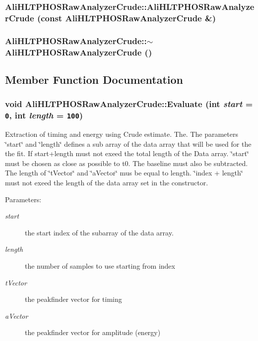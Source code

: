 \subsubsection{\setlength{\rightskip}{0pt plus 5cm}Ali\-HLTPHOSRaw\-Analyzer\-Crude::Ali\-HLTPHOSRaw\-Analyzer\-Crude (const {\bf Ali\-HLTPHOSRaw\-Analyzer\-Crude} \&)}\label{classAliHLTPHOSRawAnalyzerCrude_a1}


\subsubsection{\setlength{\rightskip}{0pt plus 5cm}Ali\-HLTPHOSRaw\-Analyzer\-Crude::$\sim${\bf Ali\-HLTPHOSRaw\-Analyzer\-Crude} ()\hspace{0.3cm}{\tt  [virtual]}}\label{classAliHLTPHOSRawAnalyzerCrude_a3}




\subsection{Member Function Documentation}
\subsubsection{\setlength{\rightskip}{0pt plus 5cm}void Ali\-HLTPHOSRaw\-Analyzer\-Crude::Evaluate (int {\em start} = {\tt 0}, int {\em length} = {\tt 100})\hspace{0.3cm}{\tt  [virtual]}}\label{classAliHLTPHOSRawAnalyzerCrude_a4}


Extraction of timing and energy using Crude estimate. The. The parameters \char`\"{}start\char`\"{} and \char`\"{}length\char`\"{} defines a sub array of the data array that will be used for the the fit. If start+length must not exeed the total length of the Data array. \char`\"{}start\char`\"{} must be chosen as close as possible to t0. The baseline must also be subtracted. The length of \char`\"{}t\-Vector\char`\"{} and \char`\"{}a\-Vector\char`\"{} mus be equal to length. \char`\"{}index + length\char`\"{} must not exeed the length of the data array set in the constructor. \begin{Desc}
\item[Parameters:]
\begin{description}
\item[{\em start}]the start index of the subarray of the data array. \item[{\em length}]the number of samples to use starting from index \item[{\em t\-Vector}]the peakfinder vector for timing \item[{\em a\-Vector}]the peakfinder vector for amplitude (energy) \end{description}
\end{Desc}


